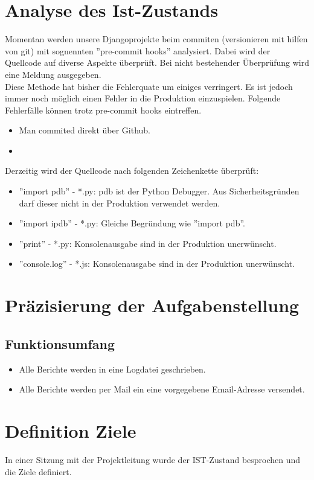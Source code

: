 \section{Analyse des Ist-Zustands}
Momentan werden unsere Djangoprojekte beim commiten (versionieren mit hilfen von git) mit sognennten ''pre-commit hooks'' analysiert. 
Dabei wird der Quellcode auf diverse Aspekte überprüft. Bei nicht bestehender Überprüfung wird eine Meldung ausgegeben.\\
Diese Methode hat bisher die Fehlerquate um einiges verringert. Es ist jedoch immer noch möglich einen Fehler in die Produktion einzuspielen.  
Folgende Fehlerfälle können trotz pre-commit hooks eintreffen. 
\begin{itemize}
    \item Man commited direkt über Github.
    \item 
\end{itemize}
Derzeitig wird der Quellcode nach folgenden Zeichenkette überprüft:
\begin{itemize}
    \item ''import pdb'' - *.py: 
        pdb ist der Python Debugger. Aus Sicherheitsgründen darf dieser nicht in der Produktion verwendet werden.
    \item ''import ipdb'' - *.py:
        Gleiche Begründung wie ''import pdb''.
    \item ''print'' - *.py:
        Konsolenausgabe sind in der Produktion unerwünscht.
    \item ''console.log'' - *.js:
        Konsolenausgabe sind in der Produktion unerwünscht.
\end{itemize}




\section{Präzisierung der Aufgabenstellung}


\subsection{Funktionsumfang}
\begin{itemize}
    \item Alle Berichte werden in eine Logdatei geschrieben. 
    \item Alle Berichte werden per Mail ein eine vorgegebene Email-Adresse versendet. 
\end{itemize}

\section{Definition Ziele}
In einer Sitzung mit der Projektleitung wurde der IST-Zustand besprochen und die Ziele definiert.
\clearpage
